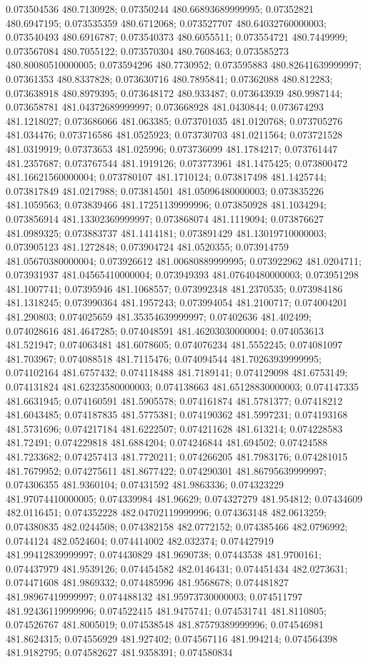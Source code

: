 0.073504536 480.7130928; 0.07350244 480.66893689999995; 0.07352821 480.6947195; 0.073535359 480.6712068; 0.073527707 480.64032760000003; 0.073540493 480.6916787; 0.073540373 480.6055511; 0.073554721 480.7449999; 0.073567084 480.7055122; 0.073570304 480.7608463; 0.073585273 480.80080510000005; 0.073594296 480.7730952; 0.073595883 480.82641639999997; 0.07361353 480.8337828; 0.073630716 480.7895841; 0.07362088 480.812283; 0.073638918 480.8979395; 0.073648172 480.933487; 0.073643939 480.9987144; 0.073658781 481.04372689999997; 0.073668928 481.0430844; 0.073674293 481.1218027; 0.073686066 481.063385; 0.073701035 481.0120768; 0.073705276 481.034476; 0.073716586 481.0525923; 0.073730703 481.0211564; 0.073721528 481.0319919; 0.07373653 481.025996; 0.073736099 481.1784217; 0.073761447 481.2357687; 0.073767544 481.1919126; 0.073773961 481.1475425; 0.073800472 481.16621560000004; 0.073780107 481.1710124; 0.073817498 481.1425744; 0.073817849 481.0217988; 0.073814501 481.05096480000003; 0.073835226 481.1059563; 0.073839466 481.17251139999996; 0.073850928 481.1034294; 0.073856914 481.13302369999997; 0.073868074 481.1119094; 0.073876627 481.0989325; 0.073883737 481.1414181; 0.073891429 481.13019710000003; 0.073905123 481.1272848; 0.073904724 481.0520355; 0.073914759 481.05670380000004; 0.073926612 481.00680889999995; 0.073922962 481.0204711; 0.073931937 481.04565410000004; 0.073949393 481.07640480000003; 0.073951298 481.1007741; 0.07395946 481.1068557; 0.073992348 481.2370535; 0.073984186 481.1318245; 0.073990364 481.1957243; 0.073994054 481.2100717; 0.074004201 481.290803; 0.074025659 481.35354639999997; 0.07402636 481.402499; 0.074028616 481.4647285; 0.074048591 481.46203030000004; 0.074053613 481.521947; 0.074063481 481.6078605; 0.074076234 481.5552245; 0.074081097 481.703967; 0.074088518 481.7115476; 0.074094544 481.70263939999995; 0.074102164 481.6757432; 0.074118488 481.7189141; 0.074129098 481.6753149; 0.074131824 481.62323580000003; 0.074138663 481.65128830000003; 0.074147335 481.6631945; 0.074160591 481.5905578; 0.074161874 481.5781377; 0.07418212 481.6043485; 0.074187835 481.5775381; 0.074190362 481.5997231; 0.074193168 481.5731696; 0.074217184 481.6222507; 0.074211628 481.613214; 0.074228583 481.72491; 0.074229818 481.6884204; 0.074246844 481.694502; 0.07424588 481.7233682; 0.074257413 481.7720211; 0.074266205 481.7983176; 0.074281015 481.7679952; 0.074275611 481.8677422; 0.074290301 481.86795639999997; 0.074306355 481.9360104; 0.07431592 481.9863336; 0.074323229 481.97074410000005; 0.074339984 481.96629; 0.074327279 481.954812; 0.07434609 482.0116451; 0.074352228 482.04702119999996; 0.074363148 482.0613259; 0.074380835 482.0244508; 0.074382158 482.0772152; 0.074385466 482.0796992; 0.0744124 482.0524604; 0.074414002 482.032374; 0.074427919 481.99412839999997; 0.074430829 481.9690738; 0.07443538 481.9700161; 0.074437979 481.9539126; 0.074454582 482.0146431; 0.074451434 482.0273631; 0.074471608 481.9869332; 0.074485996 481.9568678; 0.074481827 481.98967419999997; 0.074488132 481.95973730000003; 0.074511797 481.92436119999996; 0.074522415 481.9475741; 0.074531741 481.8110805; 0.074526767 481.8005019; 0.074538548 481.87579389999996; 0.074546981 481.8624315; 0.074556929 481.927402; 0.074567116 481.994214; 0.074564398 481.9182795; 0.074582627 481.9358391; 0.074580834 